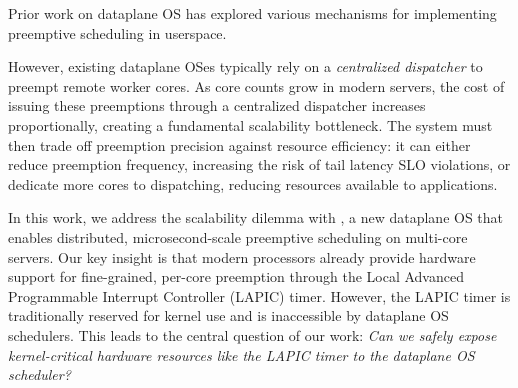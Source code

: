 Prior work on dataplane OS has explored various mechanisms for implementing preemptive scheduling in userspace.

However, existing dataplane OSes typically rely on a \textit{centralized dispatcher} to preempt remote worker cores.
As core counts grow in modern servers, the cost of issuing these preemptions through a centralized dispatcher increases proportionally, creating a fundamental scalability bottleneck.
The system must then trade off preemption precision against resource efficiency:
it can either reduce preemption frequency, increasing the risk of tail latency SLO violations, or dedicate more cores to dispatching, reducing resources available to applications.

In this work, we address the scalability dilemma with \sysname, a new dataplane OS that enables distributed, microsecond-scale preemptive scheduling on multi-core servers.
Our key insight is that modern processors already provide hardware support for fine-grained, per-core preemption through the Local Advanced Programmable Interrupt Controller (LAPIC) timer.
However, the LAPIC timer is traditionally reserved for kernel use and is inaccessible by dataplane OS schedulers.
This leads to the central question of our work:
\textit{Can we safely expose kernel-critical hardware resources like the LAPIC timer to the dataplane OS scheduler?}

